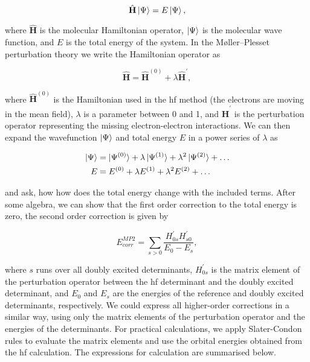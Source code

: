 \begin{equation}
\hat{\mathbf{H}}\ket{\Psi}=E\ket{\Psi},
\end{equation}

where \(\hat{\mathbf{H}}\) is the molecular Hamiltonian operator, \(\ket{\Psi}\) is the molecular wave function, and \(E\) is the total energy of the system. In the Møller--Plesset perturbation theory we write the Hamiltonian operator as

\begin{equation}
\hat{\mathbf{H}}=\hat{\mathbf{H}}^{(0)}+\lambda\hat{\mathbf{H}}^{'},
\end{equation}

where \(\hat{\mathbf{H}}^{(0)}\) is the Hamiltonian used in the \acrshort{hf} method (the electrons are moving in the mean field), \(\lambda\) is a parameter between 0 and 1, and \(\hat{\mathbf{H}}^{'}\) is the perturbation operator representing the missing electron-electron interactions. We can then expand the wavefunction \(\ket{\Psi}\) and total energy \(E\) in a power series of \(\lambda\) as

\begin{align}
\ket{\Psi}&=\ket{\Psi^{(0)}}+\lambda\ket{\Psi^{(1)}}+\lambda^2\ket{\Psi^{(2)}}+\dots \\
E&=E^{(0)}+\lambda E^{(1)}+\lambda^2 E^{(2)}+\dots
\end{align}

and ask, how how does the total energy change with the included terms. After some algebra, we can show that the first order correction to the total energy is zero, the second order correction is given by

\begin{equation}
E_{corr}^{MP2}=\sum_{s>0}\frac{H_{0s}^{'}H_{s0}^{'}}{E_0-E_s},
\end{equation}

where \(s\) runs over all doubly excited determinants, \(H_{0s}^{'}\) is the matrix element of the perturbation operator between the \acrshort{hf} determinant and the doubly excited determinant, and \(E_0\) and \(E_s\) are the energies of the reference and doubly excited determinants, respectively.\cite{10.1002/wcms.58,1014569052} We could express all higher-order corrections in a similar way, using only the matrix elements of the perturbation operator and the energies of the determinants. For practical calculations, we apply Slater-Condon rules to evaluate the matrix elements and use the orbital energies obtained from the \acrshort{hf} calculation. The expressions for calculation are summarised below.

